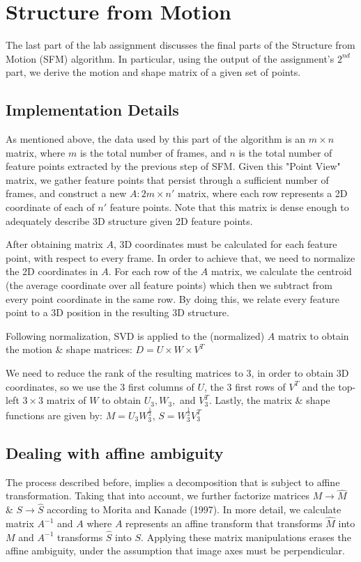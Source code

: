 \section{Structure from Motion}
\label{sfm}

The last part of the lab assignment discusses the final parts of the Structure from Motion (SFM) algorithm. In particular, using the output of the assignment's $2^{nd}$ part, we derive the motion and shape matrix of a given set of points.  

\subsection{Implementation Details}
As mentioned above, the data used by this part of the algorithm is an $m\times n$ matrix, where $m$ is the total number of frames, and $n$ is the total number of feature points extracted by the previous step of SFM. 
Given this "Point View" matrix, we gather feature points that persist through a sufficient number of frames, and construct a new $A: 2m\times n'$ matrix, where each row represents a 2D coordinate of each of $n'$ feature points. Note that this matrix is dense enough to adequately describe 3D structure given 2D feature points.

After obtaining matrix $A$, 3D coordinates must be calculated for each feature point, with respect to every frame. In order to achieve that, we need to normalize the 2D coordinates in $A$. For each row of the $A$ matrix, we calculate the centroid (the average coordinate over all feature points) which then we subtract from every point coordinate in the same row. By doing this, we relate every feature point to a 3D position in the resulting 3D structure.

Following normalization, SVD is applied to the (normalized) $A$ matrix to obtain the motion \& shape matrices:  
$D = U\times W\times V^T$

We need to reduce the rank of the resulting matrices to 3, in order to obtain 3D coordinates, so we use the 3 first columns of $U$, the 3 first rows of $V^T$ and the top-left $3\times 3$ matrix of $W$ to obtain $U_3, W_3,$ and $V^T_3$. Lastly, the matrix \& shape functions are given by: $M = U_3W^{\frac{1}{2}}_3$, $S = W_3^{\frac{1}{2}}V^T_3$

\subsection{Dealing with affine ambiguity}
The process described before, implies a decomposition that is subject to affine transformation\cite{amb}. Taking that into account, we further factorize matrices $M\rightarrow \hat{M}$ \& $S\rightarrow \hat{S}$ according to Morita and Kanade (1997)\cite{amb}. In more detail, we calculate matrix $A^{-1}$ and $A$ where $A$ represents an affine transform that transforms $\hat{M}$ into $M$ and $A^{-1}$ transforms $\hat{S}$ into $S$. Applying these matrix manipulations erases the affine ambiguity, under the assumption that image axes must be perpendicular\cite{amb}.

